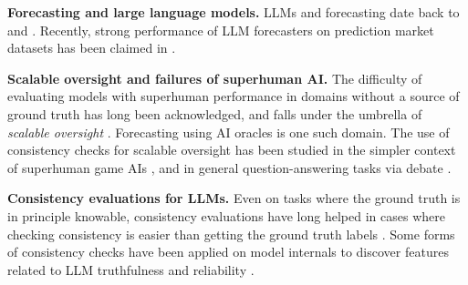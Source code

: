 \textbf{Forecasting and large language models.}
LLMs and forecasting date back to \citet{zou2022forecasting} and \citet{yan2023autocast++}. Recently, strong performance of LLM forecasters on prediction market datasets has been claimed in .

\textbf{Scalable oversight and failures of superhuman AI.}
The difficulty of evaluating models with superhuman performance in domains without a source of ground truth has long been acknowledged, and falls under the umbrella of \emph{scalable oversight}  \citep{amodei2016concrete}.
Forecasting using AI oracles is one such domain.  The use of consistency checks for scalable oversight has been studied in the simpler context of superhuman game AIs \citep{alphazero_not_robust, esmwcc},
and in general question-answering tasks via debate \citep{irving2018debate}.

\textbf{Consistency evaluations for LLMs.}
Even on tasks where the ground truth is in principle knowable,
consistency evaluations have long helped in cases where checking consistency is easier than getting the ground truth labels \citep{elazarPararel2021, liGeneratorValidatorConsistency2023}.
Some forms of consistency checks have been applied on model internals to discover features related to LLM truthfulness and reliability \citep{burnsDiscoveringLatentKnowledge2022, kaarelSearchingModelsConcepts2023}.


